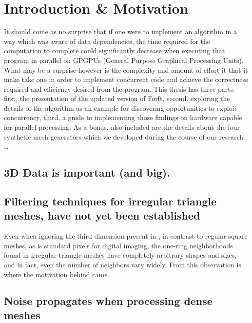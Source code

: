 \chapter{Introduction \& Motivation}
\label{ch1}
It should come as no surprise that if one were to implement an algorithm in a way which was aware of data dependencies, the time required for the computation to complete could significantly decrease when executing that program in parallel on GPGPUs (General Purpose Graphical Processing Units).  What may be a surprise however is the complexity and amount of effort it that it make take one in order to implement concurrent code and achieve the correctness required and efficiency desired from the program. This thesis has three parts: first, the presentation of the updated version of Forf{t}, second, exploring the details of the algorithm as an example for discovering opportunities to exploit concurrency, third, a guide to implementing those findings on hardware capable for parallel processing. As a bonus, also included are the details about the four synthetic mesh generators which we developed during the course of our research.
\ldots
{}

%
%
%
\section{3D Data is important (and big).}

\section{Filtering techniques for irregular triangle meshes, have not yet been established}
Even when ignoring the third dimension present in \tdd{}, in contrast to regular square meshes, as is standard pixels for digital imaging, the one-ring neighborhoods found in irregular triangle meshes have completely arbitrary shapes and sizes, and in fact, even the number of neighbors vary widely. From this observation is where the motivation behind  came.
%
\section{Noise propagates when processing dense meshes}

